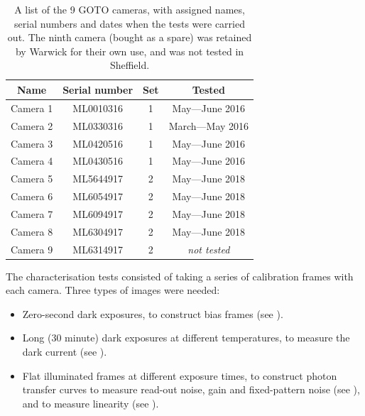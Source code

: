\begin{colsection}
\begin{colsection}
\begin{table}[t]
    \begin{center}
        \begin{tabular}{c|ccc} %
            Name     & Serial number & Set & Tested \\
            \midrule
            Camera 1 & ML0010316     &   1 & May---June 2016     \\
            Camera 2 & ML0330316     &   1 & March---May 2016    \\
            Camera 3 & ML0420516     &   1 & May---June 2016     \\
            Camera 4 & ML0430516     &   1 & May---June 2016     \\
            Camera 5 & ML5644917     &   2 & May---June 2018     \\
            Camera 6 & ML6054917     &   2 & May---June 2018     \\
            Camera 7 & ML6094917     &   2 & May---June 2018     \\
            Camera 8 & ML6304917     &   2 & May---June 2018     \\
            Camera 9 & ML6314917     &   2 & \textit{not tested} \\
        \end{tabular}
    \end{center}
    \caption[List of GOTO cameras]{
        A list of the 9 GOTO cameras, with assigned names, serial numbers and dates when the tests were carried out. The ninth camera (bought as a spare) was retained by Warwick for their own use, and was not tested in Sheffield.
    }\label{tab:cameras}
\end{table}

The characterisation tests consisted of taking a series of calibration frames with each camera. Three types of images were needed:

\begin{itemize}
    \item Zero-second dark exposures, to construct bias frames (see ).
    \item Long (30 minute) dark exposures at different temperatures, to measure the dark current (see ).
    \item Flat illuminated frames at different exposure times, to construct photon transfer curves to measure read-out noise, gain and fixed-pattern noise (see ), and to measure linearity (see ).
\end{itemize}


\end{colsection}
\end{colsection}
